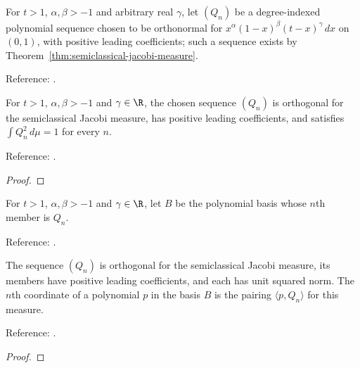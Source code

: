 \begin{definition}
\label{def:semiclassical-jacobi-sequence}
\leanok
For $t>1$, $\alpha,\beta>-1$ and arbitrary real $\gamma$, let $(Q_n)$ be a
degree-indexed polynomial sequence chosen to be orthonormal for
$x^\alpha(1-x)^\beta(t-x)^\gamma\,dx$ on $(0,1)$, with positive leading
coefficients; such a sequence exists by Theorem~\ref{thm:semiclassical-jacobi-measure}.

Reference: \cite[Section 3]{pgso}.
\end{definition}

\begin{theorem}
\label{thm:semiclassical-jacobi-orthonormality}
\leanok
For $t>1$, $\alpha,\beta>-1$ and $\gamma\in\R$, the chosen sequence $(Q_n)$
is orthogonal for the semiclassical Jacobi measure, has positive leading
coefficients, and satisfies $\int Q_n^2\,d\mu=1$ for every $n$.

Reference: \cite[Section 3]{pgso}.
\end{theorem}
\begin{proof}
\leanok
\end{proof}

\begin{supporting}
\begin{definition}
\label{def:semiclassical-jacobi-basis}
\leanok
For $t>1$, $\alpha,\beta>-1$ and $\gamma\in\R$, let $B$ be the polynomial
basis whose $n$th member is $Q_n$.

Reference: \cite[Section 3]{pgso}.
\end{definition}

\begin{theorem}
\label{thm:semiclassical-jacobi-sequence-basic}
\leanok
The sequence $(Q_n)$ is orthogonal for the semiclassical Jacobi measure, its
members have positive leading coefficients, and each has unit squared norm.
The $n$th coordinate of a polynomial $p$ in the basis $B$ is the pairing
$\langle p,Q_n\rangle$ for this measure.

Reference: \cite[Section 3]{pgso}.
\end{theorem}
\begin{proof}
\leanok
\end{proof}
\end{supporting}


